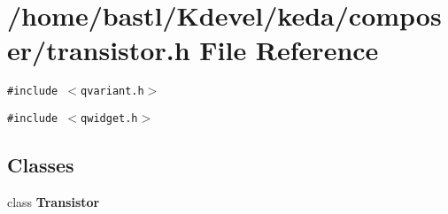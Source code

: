 \section{/home/bastl/Kdevel/keda/composer/transistor.h File Reference}
\label{transistor_8h}
{\tt \#include $<$qvariant.h$>$}\par
{\tt \#include $<$qwidget.h$>$}\par
\subsection*{Classes}
\begin{CompactItemize}
\item 
class {\bf Transistor}
\end{CompactItemize}
